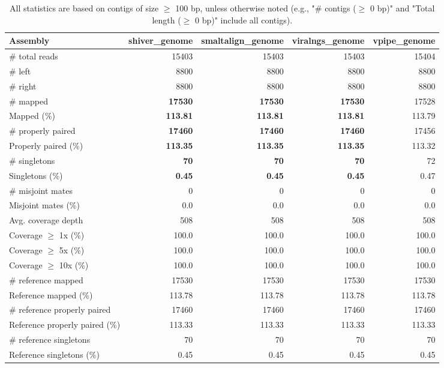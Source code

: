 \documentclass[12pt,a4paper]{article}
\begin{document}
\begin{table}[ht]
\begin{center}
\caption{All statistics are based on contigs of size $\geq$ 100 bp, unless otherwise noted (e.g., "\# contigs ($\geq$ 0 bp)" and "Total length ($\geq$ 0 bp)" include all contigs).}
\begin{tabular}{|l*{4}{|r}|}
\hline
Assembly & shiver\_genome & smaltalign\_genome & viralngs\_genome & vpipe\_genome \\ \hline
\# total reads & 15403 & 15403 & 15403 & 15404 \\ \hline
\# left & 8800 & 8800 & 8800 & 8800 \\ \hline
\# right & 8800 & 8800 & 8800 & 8800 \\ \hline
\# mapped & {\bf 17530} & {\bf 17530} & {\bf 17530} & 17528 \\ \hline
Mapped (\%) & {\bf 113.81} & {\bf 113.81} & {\bf 113.81} & 113.79 \\ \hline
\# properly paired & {\bf 17460} & {\bf 17460} & {\bf 17460} & 17456 \\ \hline
Properly paired (\%) & {\bf 113.35} & {\bf 113.35} & {\bf 113.35} & 113.32 \\ \hline
\# singletons & {\bf 70} & {\bf 70} & {\bf 70} & 72 \\ \hline
Singletons (\%) & {\bf 0.45} & {\bf 0.45} & {\bf 0.45} & 0.47 \\ \hline
\# misjoint mates & 0 & 0 & 0 & 0 \\ \hline
Misjoint mates (\%) & 0.0 & 0.0 & 0.0 & 0.0 \\ \hline
Avg. coverage depth & 508 & 508 & 508 & 508 \\ \hline
Coverage $\geq$ 1x (\%) & 100.0 & 100.0 & 100.0 & 100.0 \\ \hline
Coverage $\geq$ 5x (\%) & 100.0 & 100.0 & 100.0 & 100.0 \\ \hline
Coverage $\geq$ 10x (\%) & 100.0 & 100.0 & 100.0 & 100.0 \\ \hline
\# reference mapped & 17530 & 17530 & 17530 & 17530 \\ \hline
Reference mapped (\%) & 113.78 & 113.78 & 113.78 & 113.78 \\ \hline
\# reference properly paired & 17460 & 17460 & 17460 & 17460 \\ \hline
Reference properly paired (\%) & 113.33 & 113.33 & 113.33 & 113.33 \\ \hline
\# reference singletons & 70 & 70 & 70 & 70 \\ \hline
Reference singletons (\%) & 0.45 & 0.45 & 0.45 & 0.45 \\ \hline

\end{tabular}
\end{center}
\end{table}
\end{document}

